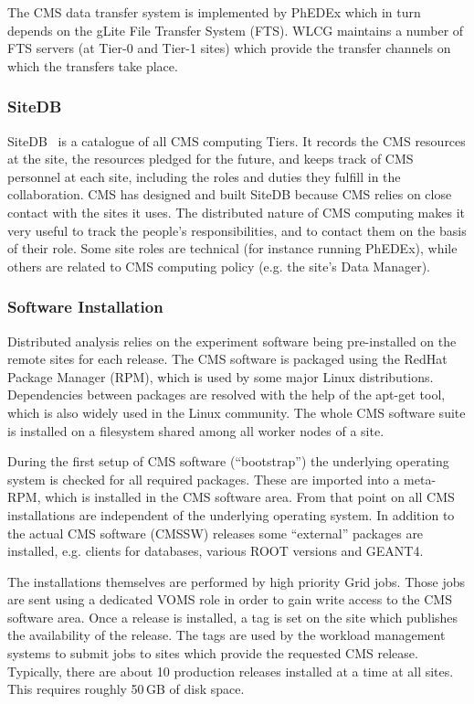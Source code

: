 The CMS data transfer system is implemented by PhEDEx which
in turn depends on the gLite File Transfer System (FTS).
WLCG maintains a number of FTS servers (at Tier-0 and Tier-1 sites)
which provide the transfer channels on which the transfers take place.


\subsubsection{ SiteDB }
\label{sec:4_1_2}
SiteDB~\cite{RefSiteDB} is a catalogue of all CMS computing Tiers.
It records the CMS resources at the site, the resources pledged for the future,
and keeps track of CMS personnel at each site, including the roles
and duties they fulfill in the collaboration.
CMS has designed and built SiteDB because CMS relies on close contact
with the sites it uses. The distributed nature of CMS computing makes
it very useful to track the people's responsibilities, and to contact
them on the basis of their role. Some site roles are technical
 (for instance running PhEDEx), while others are related to CMS computing
 policy (e.g. the site's Data Manager).

\subsubsection{ Software Installation }
\label{sec:4_1_3}
Distributed analysis relies on the experiment software being
pre-installed on the remote sites for each release. The CMS software
is packaged using the RedHat Package Manager (RPM), which is used by
some major Linux distributions. Dependencies between packages are
resolved with the help of the apt-get tool, which is also widely used in
the Linux community. The whole CMS software suite is installed
on a filesystem shared among all worker nodes of a site.

During the
first setup of CMS software (``bootstrap'') the underlying operating system is
checked for all required packages. These are imported into a meta-RPM,
which is installed in the CMS software area. From that point on all
CMS installations are independent of the underlying operating
system. In addition to the actual CMS software (CMSSW) releases some ``external'' 
packages are installed, e.g. clients for databases, various ROOT
versions and GEANT4.

The installations themselves are performed by high priority Grid
jobs. Those jobs are sent using a dedicated VOMS role %
in order to gain write access to the CMS software area. Once a release is
installed, a tag is set on the 
site which publishes the availability of
the release. The tags are used by the workload management systems to
submit jobs to sites which provide the requested CMS release.
Typically, there are about 10 production releases installed at a time at all
sites. This requires roughly 50\,GB of disk space.

